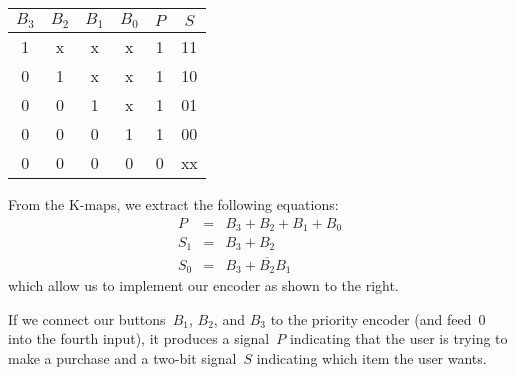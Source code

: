 \begin{minipage}{1.95in}
\begin{tabular}{cccc|cc}\\
$B_3$& $B_2$& $B_1$& $B_0$& $P$& $S$\\ \hline
1&x&x&x& 1& 11\\
0&1&x&x& 1& 10\\
0&0&1&x& 1& 01\\
0&0&0&1& 1& 00\\
0&0&0&0& 0& xx\\
\end{tabular}\vspace{12pt}
\end{minipage}\hspace{0.25in}\begin{minipage}{1.05in}
\end{minipage}\hspace{0.25in}\begin{minipage}{1.05in}
\end{minipage}\hspace{0.25in}\begin{minipage}{1.05in}
\end{minipage}

\begin{minipage}{3.6in}
From the \mbox{K-maps}, we extract the following equations:
\begin{eqnarray*}
P &=& B_3 + B_2 + B_1 + B_0\\
S_1 &=& B_3 + B_2\\
S_0 &=& B_3 + \overline{B_2}B_1
\end{eqnarray*}
which allow us to implement our encoder as shown to the right.\mpline

If we connect our buttons~$B_1$, $B_2$, and $B_3$ to the priority 
encoder (and feed~$0$ into the fourth input), it produces a signal~$P$ 
indicating that the user is trying to make a purchase and a two-bit
signal~$S$ indicating which item the user wants.
\end{minipage}\hspace{0.25in}\begin{minipage}{2.65in}
\end{minipage}

